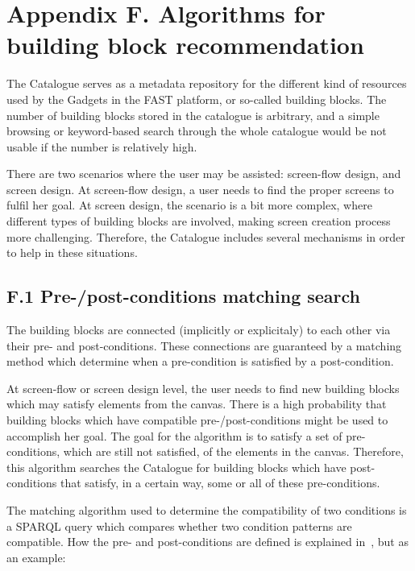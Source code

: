 \documentclass{fast_latex}
\begin{document}
\clearpage
\section*{Appendix F. Algorithms for building block recommendation}
\label{appendix_f}

The Catalogue serves as a metadata repository for the different kind of resources used by the Gadgets in the FAST platform, or so-called building blocks. The number of building blocks stored in the catalogue is arbitrary, and a simple browsing or keyword-based search through the whole catalogue would be not usable if the number is relatively high.

There are two scenarios where the user may be assisted: screen-flow design, and screen design. At screen-flow design, a user needs to find the proper screens to fulfil her goal. At screen design, the scenario is a bit more complex, where different types of building blocks are involved, making screen creation process more challenging. Therefore, the Catalogue includes several mechanisms in order to help in these situations.


\subsection*{F.1 Pre-/post-conditions matching search}

The building blocks are connected (implicitly or explicitaly) to each other via their pre- and post-conditions. These connections are guaranteed by a matching method which determine when a pre-condition is satisfied by a post-condition.

At screen-flow or screen design level, the user needs to find new building blocks which may satisfy elements from the canvas. There is a high probability that building blocks which have compatible pre-/post-conditions might be used to accomplish her goal. The goal for the algorithm is to satisfy a set of pre-conditions, which are still not satisfied, of the elements in the canvas. Therefore, this algorithm searches the Catalogue for building blocks which have post-conditions that satisfy, in a certain way, some or all of these pre-conditions.

The matching algorithm used to determine the compatibility of two conditions is a SPARQL query which compares whether two condition patterns are compatible. How the pre- and post-conditions are defined is explained in~\cite{moeller2011fast_ontology}, but as an example:
\end{document}
